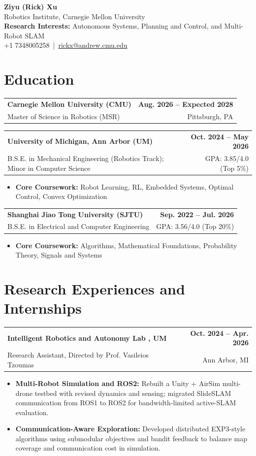\documentclass[11pt,letterpaper]{article}
\makeatletter
\newcommand{\resumeSubheading}[4]{
    \begin{tabularx}{\textwidth}{@{}Xr@{}}
        \textbf{#1} & \textbf{#2} \\
        #3 & #4 \\
    \end{tabularx}
}
\newcommand{\resumeItem}[1]{
    \item #1
}
\makeatother
\begin{document}
\begin{center}
    {\LARGE \textbf{Ziyu (Rick) Xu}} \\[2pt]
    {\small Robotics Institute, Carnegie Mellon University} \\[1pt]
    {\small \textbf{Research Interests:} Autonomous Systems, Planning and Control, and Multi-Robot SLAM} \\[1pt]
    {\small
    +1 7348005258
    \,|\, 
    \href{mailto:rickx@andrew.cmu.edu}{rickx@andrew.cmu.edu}
    } \\[1pt]
\end{center}

\section*{Education}
\resumeSubheading
{Carnegie Mellon University (CMU)}
{Aug. 2026 -- Expected 2028}
{\hspace*{1.4em}Master of Science in Robotics (MSR)}
{Pittsburgh, PA}
\resumeSubheading
{University of Michigan, Ann Arbor (UM)}
{Oct. 2024 -- May 2026}
{\hspace*{1.4em}B.S.E. in Mechanical Engineering (Robotics Track); Minor in Computer Science}
{GPA: 3.85/4.0 (Top 5\%)}
\begin{itemize}[leftmargin=2.4em, itemsep=0.5pt, topsep=0pt]
    \item \textbf{Core Coursework:} Robot Learning, RL, Embedded Systems, Optimal Control, Convex Optimization
\end{itemize}

\resumeSubheading
{Shanghai Jiao Tong University (SJTU)}
{Sep. 2022 -- Jul. 2026}
{\hspace*{1.4em}B.S.E. in Electrical and Computer Engineering}
{GPA: 3.56/4.0 (Top 20\%)}
\begin{itemize}[leftmargin=2.4em, itemsep=0.5pt, topsep=0pt]
    \item \textbf{Core Coursework:} Algorithms, Mathematical Foundations, Probability Theory, Signals and Systems
\end{itemize}
\section*{Research Experiences and Internships}
\resumeSubheading
{Intelligent Robotics and Autonomy Lab , UM}
{Oct. 2024 -- Apr. 2026}
{\hspace*{1.4em}Research Assistant, Directed by Prof. Vasileios Tzoumas}
{Ann Arbor, MI}
\begin{itemize}[leftmargin=2.4em, itemsep=0.5pt, topsep=0pt]
\small
\resumeItem{\textbf{Multi-Robot Simulation and ROS2:} Rebuilt a Unity + AirSim multi-drone testbed with revised dynamics and sensing; migrated SlideSLAM communication from ROS1 to ROS2 for bandwidth-limited active-SLAM evaluation.}
\resumeItem{\textbf{Communication-Aware Exploration:} Developed distributed EXP3-style algorithms using submodular objectives and bandit feedback to balance map coverage and communication cost in simulation.}
\end{itemize}
\end{document}
